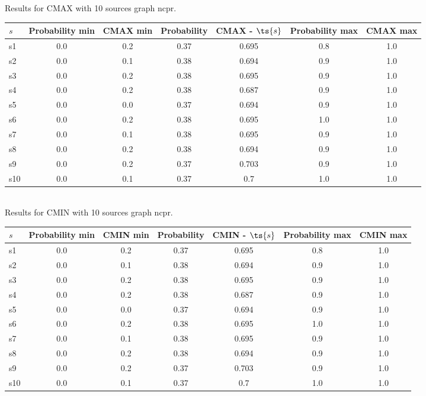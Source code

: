 \documentclass{article}
\begin{document}
\noindent Results for CMAX with 10 sources graph ncpr.

\noindent\begin{tabular}{|l|c|c|c|c|c|c|}
\hline
$s$& Probability min & CMAX min & Probability & CMAX - $\ts{s}$ & Probability max & CMAX max\\
\hline
s1 &0.0 & 0.2 & 0.37 & 0.695 & 0.8 & 1.0\\
\hline
s2 &0.0 & 0.1 & 0.38 & 0.694 & 0.9 & 1.0\\
\hline
s3 &0.0 & 0.2 & 0.38 & 0.695 & 0.9 & 1.0\\
\hline
s4 &0.0 & 0.2 & 0.38 & 0.687 & 0.9 & 1.0\\
\hline
s5 &0.0 & 0.0 & 0.37 & 0.694 & 0.9 & 1.0\\
\hline
s6 &0.0 & 0.2 & 0.38 & 0.695 & 1.0 & 1.0\\
\hline
s7 &0.0 & 0.1 & 0.38 & 0.695 & 0.9 & 1.0\\
\hline
s8 &0.0 & 0.2 & 0.38 & 0.694 & 0.9 & 1.0\\
\hline
s9 &0.0 & 0.2 & 0.37 & 0.703 & 0.9 & 1.0\\
\hline
s10 &0.0 & 0.1 & 0.37 & 0.7 & 1.0 & 1.0\\
\hline
\end{tabular}\\

\noindent Results for CMIN with 10 sources graph ncpr.

\noindent\begin{tabular}{|l|c|c|c|c|c|c|}
\hline
$s$& Probability min & CMIN min & Probability & CMIN - $\ts{s}$ & Probability max & CMIN max\\
\hline
s1 &0.0 & 0.2 & 0.37 & 0.695 & 0.8 & 1.0\\
\hline
s2 &0.0 & 0.1 & 0.38 & 0.694 & 0.9 & 1.0\\
\hline
s3 &0.0 & 0.2 & 0.38 & 0.695 & 0.9 & 1.0\\
\hline
s4 &0.0 & 0.2 & 0.38 & 0.687 & 0.9 & 1.0\\
\hline
s5 &0.0 & 0.0 & 0.37 & 0.694 & 0.9 & 1.0\\
\hline
s6 &0.0 & 0.2 & 0.38 & 0.695 & 1.0 & 1.0\\
\hline
s7 &0.0 & 0.1 & 0.38 & 0.695 & 0.9 & 1.0\\
\hline
s8 &0.0 & 0.2 & 0.38 & 0.694 & 0.9 & 1.0\\
\hline
s9 &0.0 & 0.2 & 0.37 & 0.703 & 0.9 & 1.0\\
\hline
s10 &0.0 & 0.1 & 0.37 & 0.7 & 1.0 & 1.0\\
\hline
\end{tabular}\\
\end{document}

